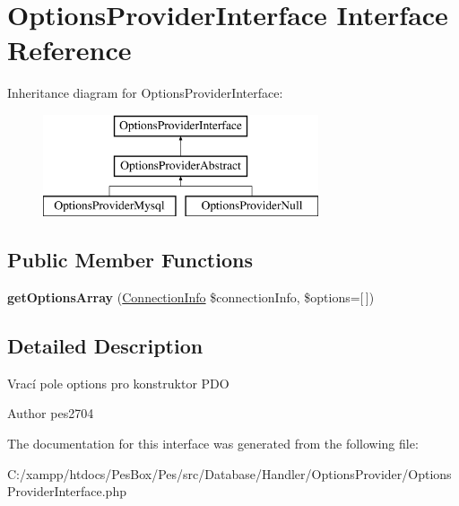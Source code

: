 \hypertarget{interface_pes_1_1_database_1_1_handler_1_1_options_provider_1_1_options_provider_interface}{}\section{Options\+Provider\+Interface Interface Reference}
\label{interface_pes_1_1_database_1_1_handler_1_1_options_provider_1_1_options_provider_interface}
Inheritance diagram for Options\+Provider\+Interface\+:\begin{figure}[H]
\begin{center}
\leavevmode
\includegraphics[height=3.000000cm]{interface_pes_1_1_database_1_1_handler_1_1_options_provider_1_1_options_provider_interface}
\end{center}
\end{figure}
\subsection*{Public Member Functions}
\begin{DoxyCompactItemize}
\item 
\mbox{\label{interface_pes_1_1_database_1_1_handler_1_1_options_provider_1_1_options_provider_interface_a413d3f400d248b03b5b4e9a67134dd47}} 
{\bfseries get\+Options\+Array} (\mbox{\hyperlink{class_pes_1_1_database_1_1_handler_1_1_connection_info}{Connection\+Info}} \$connection\+Info, \$options=\mbox{[}$\,$\mbox{]})
\end{DoxyCompactItemize}


\subsection{Detailed Description}
Vrací pole options pro konstruktor P\+DO \begin{DoxyAuthor}{Author}
pes2704 
\end{DoxyAuthor}


The documentation for this interface was generated from the following file\+:\begin{DoxyCompactItemize}
\item 
C\+:/xampp/htdocs/\+Pes\+Box/\+Pes/src/\+Database/\+Handler/\+Options\+Provider/Options\+Provider\+Interface.\+php\end{DoxyCompactItemize}
